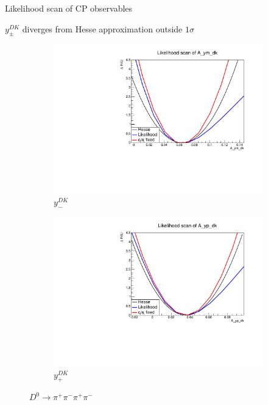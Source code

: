 \documentclass{beamer}
\begin{document}
\begin{frame}{Likelihood scan of CP observables}
  \begin{center}
    $y_\pm^{DK}$ diverges from Hesse approximation outside $1\sigma$
  \end{center}
  \begin{figure}
    \centering
    \begin{subfigure}{0.5\textwidth}
      \centering
      \includegraphics[width=1.0\textwidth]{Plots/A_ym_dk_likelihood_scan_pipipipi.pdf}
      \vspace{-0.3cm}
      \caption*{$y_-^{DK}$}
    \end{subfigure}%
    \begin{subfigure}{0.5\textwidth}
      \centering
      \includegraphics[width=1.0\textwidth]{Plots/A_yp_dk_likelihood_scan_pipipipi.pdf}
      \vspace{-0.3cm}
      \caption*{$y_+^{DK}$}
    \end{subfigure}
    \caption*{$D^0\to\pi^+\pi^-\pi^+\pi^-$}
  \end{figure}
\end{frame}
\end{document}

